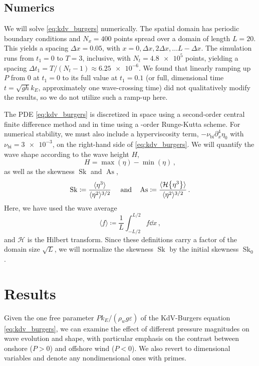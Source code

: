 \documentclass{jfm}
\DeclareMathOperator{\Sk}{Sk}
\DeclareMathOperator{\As}{As}
\newcommand{\hilbert}{\mathcal{H}}
\renewcommand*{\epsilon}{\varepsilon}
\begin{document}
\subsection{Numerics}
We will solve \cref{eq:kdv_burgers} numerically.
The spatial domain has periodic boundary conditions and $N_x = 400$
points spread over a domain of length $L = 20$.
This yields a spacing $\Delta x = 0.05$, with $x = 0, \Delta x,
2\Delta x, \ldots L - \Delta x$.
The simulation runs from $t_1 = 0$ to $T = 3$, inclusive, with
$N_t = \num{4.8e5}$ points, yielding a spacing $\Delta t_1 = T/(N_t-1)
\approx \num{6.25e-6}$.
We found that linearly ramping up $P$ from $0$ at $t_1=0$ to its full
value at $t_1 = 0.1$ (or full, dimensional time $t = \sqrt{gh} k_E$,
\ie{} approximately one wave-crossing time) did not qualitatively modify
the results, so we do not utilize such a ramp-up here.

The PDE \cref{eq:kdv_burgers} is discretized in space using a
second-order central finite difference method and in time using a
-order Runge-Kutta scheme.
For numerical stability, we must also include a hyperviscosity term,
$-\nu_{\text{bi}} \partial_x^4 \eta_0$ with $\nu_{\text{bi}} =
\num{3e-3}$, on the right-hand side of \cref{eq:kdv_burgers}.
We will quantify the wave shape according to the wave height $H$,
\begin{equation}
  H = \max(\eta) - \min(\eta) \,,
  \label{eq:height_def}
\end{equation}
as well as the skewness $\Sk$ and $\As$,
\begin{equation}
  \Sk \coloneqq \frac{\langle \eta^3 \rangle}{\langle \eta^2
  \rangle^{3/2}} \
  \qq{and}
  \As \coloneqq \frac{\langle \hilbert \Bqty{\eta^3} \rangle}{\langle
    \eta^2 \rangle^{3/2}} \,.
  \label{eq:shape_stats_def}
\end{equation}
Here, we have used the wave average
\begin{equation}
  \langle f \rangle \coloneqq \frac{1}{L} \int_{-L/2}^{L/2} f
  \dd{x} \,,
\end{equation}
and $\hilbert$ is the Hilbert transform.
Since these definitions carry a factor of the domain size $\sqrt{L}$,
we will normalize the skewness $\Sk$ by the initial skewness $\Sk_0$.

\section{\label{sec:results} Results}
Given the one free parameter $P k_E/(\rho_w g \epsilon)$ of the
KdV-Burgers equation \cref{eq:kdv_burgers}, we can examine the effect of
different pressure magnitudes on wave evolution and shape, with
particular emphasis on the contrast between onshore ($P > 0$) and
offshore wind ($P < 0$).
We also revert to dimensional variables and denote any
nondimensional ones with primes.
\end{document}
